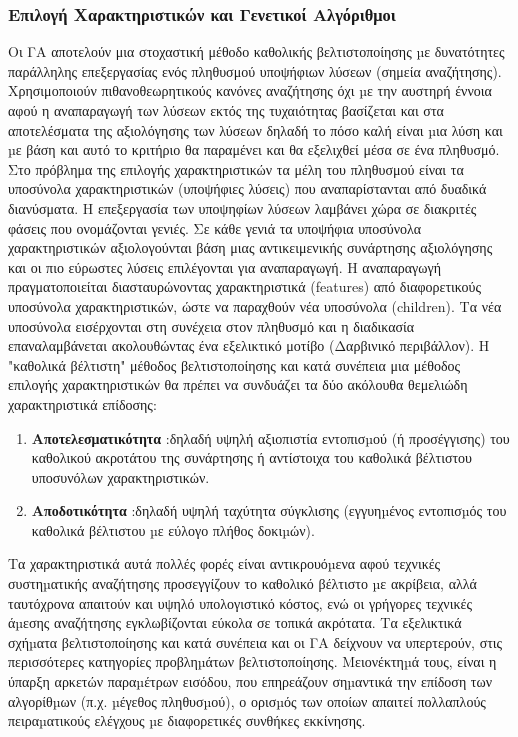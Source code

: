 \subsubsection{Επιλογή Χαρακτηριστικών και Γενετικοί Αλγόριθμοι}
Οι ΓΑ αποτελούν μια στοχαστική μέθοδο καθολικής βελτιστοποίησης µε
δυνατότητες παράλληλης επεξεργασίας ενός πληθυσμού υποψήφιων λύσεων (σημεία αναζήτησης). Χρησιμοποιούν πιθανοθεωρητικούς κανόνες αναζήτησης όχι µε την αυστηρή έννοια αφού η αναπαραγωγή των λύσεων εκτός της τυχαιότητας βασίζεται και στα αποτελέσματα της αξιολόγησης των λύσεων δηλαδή το πόσο καλή είναι µια λύση και µε βάση και αυτό το κριτήριο θα παραμένει και θα εξελιχθεί μέσα σε ένα πληθυσμό. Στο πρόβλημα της επιλογής χαρακτηριστικών τα μέλη του πληθυσμού είναι τα υποσύνολα χαρακτηριστικών (υποψήφιες λύσεις) που αναπαρίστανται από δυαδικά διανύσματα.
Η επεξεργασία των υποψηφίων λύσεων λαμβάνει χώρα σε διακριτές φάσεις που ονομάζονται γενιές.
Σε κάθε γενιά τα υποψήφια υποσύνολα χαρακτηριστικών αξιολογούνται βάση μιας αντικειμενικής συνάρτησης αξιολόγησης και οι πιο εύρωστες λύσεις επιλέγονται για αναπαραγωγή. Η αναπαραγωγή πραγματοποιείται διασταυρώνοντας χαρακτηριστικά (features) από διαφορετικούς υποσύνολα χαρακτηριστικών, ώστε να παραχθούν νέα υποσύνολα (children). Τα νέα υποσύνολα εισέρχονται στη συνέχεια στον πληθυσμό και η διαδικασία επαναλαμβάνεται ακολουθώντας ένα εξελικτικό μοτίβο (Δαρβινικό περιβάλλον).
Η "καθολικά βέλτιστη" μέθοδος βελτιστοποίησης και κατά συνέπεια μια μέθοδος επιλογής χαρακτηριστικών θα πρέπει να συνδυάζει τα δύο ακόλουθα θεμελιώδη χαρακτηριστικά επίδοσης:
\begin{enumerate}
\item \textbf{Αποτελεσματικότητα} :δηλαδή υψηλή αξιοπιστία εντοπισµού (ή προσέγγισης) του καθολικού ακροτάτου της συνάρτησης ή αντίστοιχα του καθολικά βέλτιστου υποσυνόλων χαρακτηριστικών.
\item \textbf{Αποδοτικότητα} :δηλαδή υψηλή ταχύτητα σύγκλισης (εγγυηµένος εντοπισµός του καθολικά βέλτιστου µε εύλογο πλήθος δοκιµών).
\end{enumerate}

Τα χαρακτηριστικά αυτά πολλές φορές είναι αντικρουόµενα αφού τεχνικές συστηµατικής αναζήτησης προσεγγίζουν το καθολικό βέλτιστο µε ακρίβεια, αλλά ταυτόχρονα απαιτούν και υψηλό υπολογιστικό κόστος, ενώ οι γρήγορες τεχνικές άµεσης αναζήτησης εγκλωβίζονται εύκολα σε τοπικά ακρότατα. Τα εξελικτικά σχήµατα βελτιστοποίησης και κατά συνέπεια και οι ΓΑ δείχνουν να υπερτερούν, στις περισσότερες κατηγορίες προβληµάτων βελτιστοποίησης. Μειονέκτηµά τους, είναι η ύπαρξη αρκετών παραµέτρων εισόδου, που επηρεάζουν σηµαντικά την επίδοση των αλγορίθµων (π.χ. µέγεθος πληθυσµού), ο ορισµός των οποίων απαιτεί πολλαπλούς πειραµατικούς ελέγχους µε διαφορετικές συνθήκες εκκίνησης.


